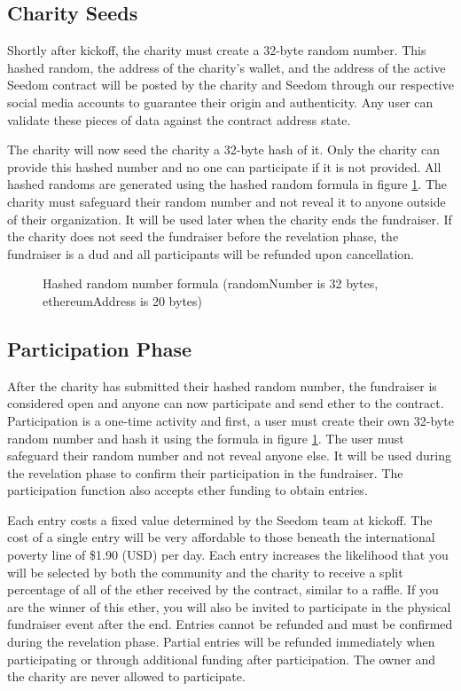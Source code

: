 \documentclass[11pt]{article}
\begin{document}
\subsection{Charity Seeds}
Shortly after kickoff, the charity must create a 32-byte random number. This hashed random, the address of the charity's wallet, and the address of the active Seedom contract will be posted by the charity and Seedom through our respective social media accounts to guarantee their origin and authenticity. Any user can validate these pieces of data against the contract address state.

The charity will now seed the charity a 32-byte hash of it. Only the charity can provide this hashed number and no one can participate if it is not provided. All hashed randoms are generated using the hashed random formula in figure \ref{figure:hashedRandomNumberFormula}. The charity must safeguard their random number and not reveal it to anyone outside of their organization. It will be used later when the charity ends the fundraiser. If the charity does not seed the fundraiser before the revelation phase, the fundraiser is a dud and all participants will be refunded upon cancellation.

\begin{figure}[H]
\begin{center}
\caption{Hashed random number formula (randomNumber is 32 bytes, ethereumAddress is 20 bytes)}
\label{figure:hashedRandomNumberFormula}
\end{center}
\end{figure}

\subsection{Participation Phase}

After the charity has submitted their hashed random number, the fundraiser is considered open and anyone can now participate and send ether to the contract. Participation is a one-time activity and first, a user must create their own 32-byte random number and hash it using the formula in figure \ref{figure:hashedRandomNumberFormula}. The user must safeguard their random number and not reveal anyone else. It will be used during the revelation phase to confirm their participation in the fundraiser. The participation function also accepts ether funding to obtain entries.

Each entry costs a fixed value determined by the Seedom team at kickoff. The cost of a single entry will be very affordable to those beneath the international poverty line of \$1.90 (USD) per day\cite{1}. Each entry increases the likelihood that you will be selected by both the community and the charity to receive a split percentage of all of the ether received by the contract, similar to a raffle. If you are the winner of this ether, you will also be invited to participate in the physical fundraiser event after the end. Entries cannot be refunded and must be confirmed during the revelation phase. Partial entries will be refunded immediately when participating or through additional funding after participation. The owner and the charity are never allowed to participate.
\end{document}
